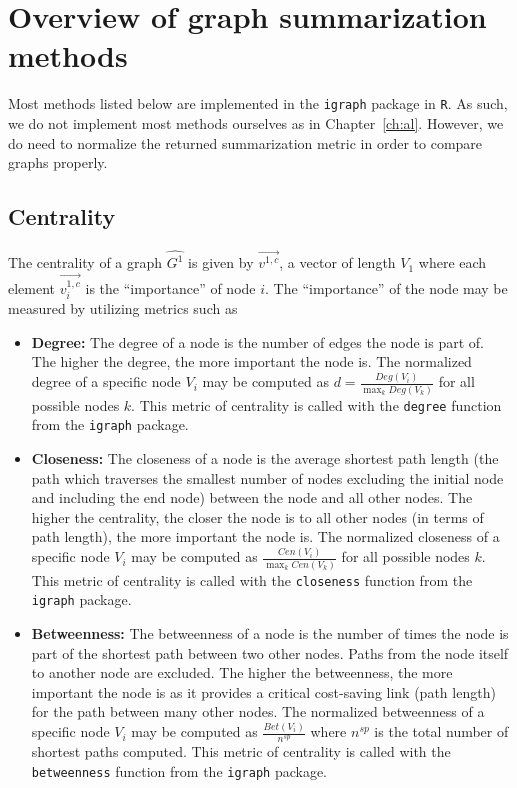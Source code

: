 \section{Overview of graph summarization methods}
\label{sec:gc:methods}

Most methods listed below are implemented in the \texttt{igraph} package in 
\texttt{R}. As such, we do not implement most methods ourselves as in 
Chapter~\ref{ch:al}. However, we do need to normalize the returned 
summarization metric in order to compare graphs properly.

\subsection{Centrality}

The centrality of a graph $\hat{G^1}$ is given by $\overrightarrow{v^{1,c}}$,  
a vector of length $V_1$ where each element 
$\overrightarrow{v^{1,c}_i}$ is the ``importance'' of node $i$. The 
``importance'' of the node may be measured by utilizing metrics such as 

\tablespacing
\begin{itemize}
	\item \textbf{Degree:} The degree of a node is the number of edges the node 
	is part of. The higher the degree, the more important the node is.	
	The normalized degree of a specific node $V_i$ may be computed as 
	$d = \frac{Deg(V_i)}{\max_k Deg(V_k)}$ for all possible nodes $k$.
	This metric of centrality is called with the 	
	\texttt{degree} function from the \texttt{igraph} package.
	\item \textbf{Closeness:} The closeness of a node is the average 
	shortest path length (the path which traverses the smallest number of 
	nodes excluding the initial node and including the end node) between the 
	node and all other nodes. The higher the centrality, 
	the closer the node is to all other nodes (in terms of path length), the 
	more important the node is.	
	The normalized closeness of a specific node $V_i$ may be computed as 
	$\frac{Cen(V_i)}{\max_k Cen(V_k)}$ for all possible nodes $k$.
	This metric of centrality is called with the 
	\texttt{closeness} function from the \texttt{igraph} package.
	\item \textbf{Betweenness:} The betweenness of a node is the number of 
	times the node is part of the shortest path between two other nodes. Paths 
	from the node itself to another node are excluded. The higher the 
	betweenness, the more important the node is as it provides a critical 
	cost-saving link (path length) for the path between many other nodes. 
	The normalized betweenness of a specific node $V_i$ may be computed as
	$\frac{Bet(V_i)}{n^{sp}}$ where $n^{sp}$ is the total number of shortest 
	paths computed.
	This metric of centrality is called with the 
	\texttt{betweenness} function from the \texttt{igraph} package.
\end{itemize}
\bodyspacing

